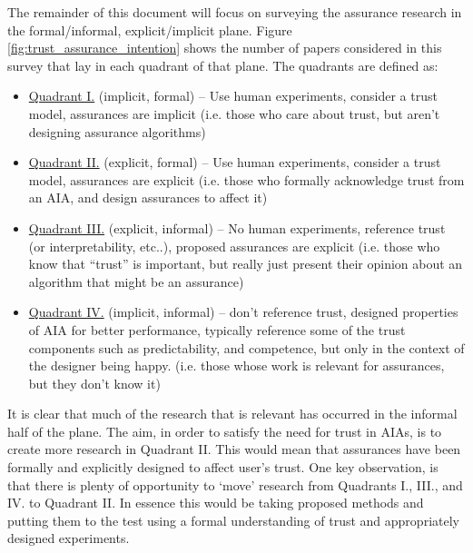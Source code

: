 The remainder of this document will focus on surveying the assurance research in the formal/informal, explicit/implicit plane. Figure \ref{fig:trust_assurance_intention} shows the number of papers considered in this survey that lay in each quadrant of that plane. The quadrants are defined as:

\begin{itemize}
    \item \hyperref[sec:q1]{Quadrant I.} (implicit, formal) -- Use human experiments, consider a trust model, assurances are implicit (i.e. those who care about trust, but aren't designing assurance algorithms)
    \item \hyperref[sec:q2]{Quadrant II.} (explicit, formal) -- Use human experiments, consider a trust model, assurances are explicit (i.e. those who formally acknowledge trust from an AIA, and design assurances to affect it)
    \item \hyperref[sec:q3]{Quadrant III.} (explicit, informal) -- No human experiments, reference trust (or interpretability, etc..), proposed assurances are explicit (i.e. those who know that ``trust'' is important, but really just present their opinion about an algorithm that might be an assurance)
    \item \hyperref[sec:q4]{Quadrant IV.} (implicit, informal) -- don't reference trust, designed properties of AIA for better performance, typically reference some of the trust components such as predictability, and competence, but only in the context of the designer being happy. (i.e. those whose work is relevant for assurances, but they don't know it)
\end{itemize}

It is clear that much of the research that is relevant has occurred in the informal half of the plane. The aim, in order to satisfy the need for trust in AIAs, is to create more research in Quadrant II. This would mean that assurances have been formally and explicitly designed to affect user's trust. One key observation, is that there is plenty of opportunity to `move' research from Quadrants I., III., and IV. to Quadrant II. In essence this would be taking proposed methods and putting them to the test using a formal understanding of trust and appropriately designed experiments.





